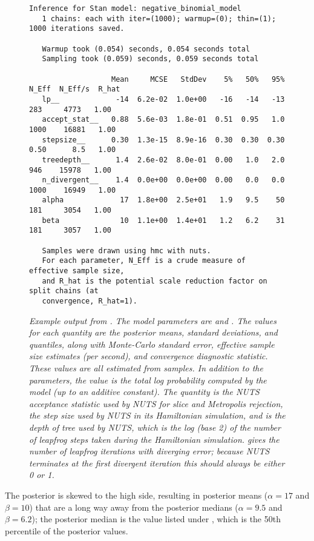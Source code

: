 \begin{figure}
\begin{Verbatim}[fontsize=\footnotesize]
   Inference for Stan model: negative_binomial_model
   1 chains: each with iter=(1000); warmup=(0); thin=(1); 1000 iterations saved.

   Warmup took (0.054) seconds, 0.054 seconds total
   Sampling took (0.059) seconds, 0.059 seconds total

                   Mean     MCSE   StdDev    5%   50%   95%  N_Eff  N_Eff/s  R_hat
   lp__             -14  6.2e-02  1.0e+00   -16   -14   -13    283     4773   1.00
   accept_stat__   0.88  5.6e-03  1.8e-01  0.51  0.95   1.0   1000    16881   1.00
   stepsize__      0.30  1.3e-15  8.9e-16  0.30  0.30  0.30   0.50      8.5   1.00
   treedepth__      1.4  2.6e-02  8.0e-01  0.00   1.0   2.0    946    15978   1.00
   n_divergent__    1.4  0.0e+00  0.0e+00  0.00   0.0   0.0   1000    16949   1.00
   alpha             17  1.8e+00  2.5e+01   1.9   9.5    50    181     3054   1.00
   beta              10  1.1e+00  1.4e+01   1.2   6.2    31    181     3057   1.00

   Samples were drawn using hmc with nuts.
   For each parameter, N_Eff is a crude measure of effective sample size,
   and R_hat is the potential scale reduction factor on split chains (at 
   convergence, R_hat=1).\end{Verbatim}
\vspace*{-6pt}
\caption{\small\it Example output from .  The model
  parameters are  and .  The values for each
  quantity are the posterior means, standard deviations, and
  quantiles, along with Monte-Carlo standard error, effective sample
  size estimates (per second), and convergence diagnostic statistic.
  These values are all estimated from samples. In addition to the
  parameters, the value  is the total log probability
  computed by the model (up to an additive constant).  The quantity
   is the NUTS acceptance statistic used by
  NUTS for slice and Metropolis rejection,  the
  step size used by NUTS in its Hamiltonian simulation, and
   is the depth of tree used by NUTS, which is the
  log (base 2) of the number of leapfrog steps taken during the
  Hamiltonian simulation.   gives the number
  of leapfrog iterations with diverging error; because NUTS terminates
  at the first divergent iteration this should always be either 0 or 1.}
\label{bin-print-eg.figure}
\end{figure}
%
The posterior is skewed to the high side, resulting in posterior means
($\alpha=17$ and $\beta=10$) that are a long way away from the posterior
medians ($\alpha=9.5$ and $\beta=6.2$);  the posterior median is the
value listed under , which is the 50th percentile of the
posterior values.

